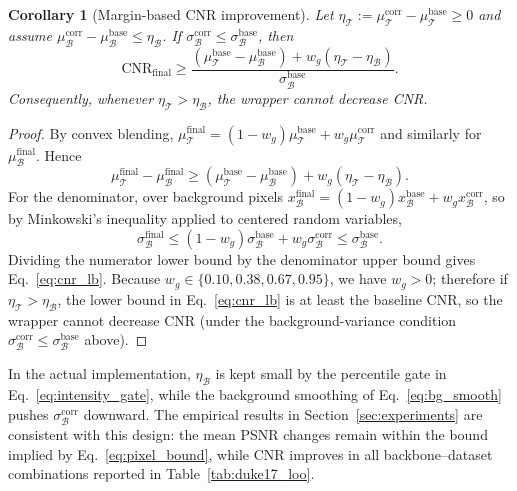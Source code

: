 \documentclass{ieeetj}
\newtheorem{corollary}{Corollary}
\begin{document}
\begin{corollary}[Margin-based CNR improvement]
\label{cor:cnr}
Let $\eta_\mathcal{T}:=\mu_\mathcal{T}^{\text{corr}}-\mu_\mathcal{T}^{\text{base}}\ge 0$ and assume $\mu_\mathcal{B}^{\text{corr}}-\mu_\mathcal{B}^{\text{base}}\le \eta_\mathcal{B}$. If $\sigma_\mathcal{B}^{\text{corr}}\le \sigma_\mathcal{B}^{\text{base}}$, then
\begin{equation}
\mathrm{CNR}_{\mathrm{final}} \ge \frac{(\mu_\mathcal{T}^{\text{base}}-\mu_\mathcal{B}^{\text{base}}) + w_g(\eta_\mathcal{T}-\eta_\mathcal{B})}{\sigma_\mathcal{B}^{\text{base}}}.
\label{eq:cnr_lb}
\end{equation}
Consequently, whenever $\eta_\mathcal{T}>\eta_\mathcal{B}$, the wrapper cannot decrease CNR.
\end{corollary}
\begin{proof}
By convex blending,
$\mu_\mathcal{T}^{\text{final}}=(1-w_g)\mu_\mathcal{T}^{\text{base}}+w_g\mu_\mathcal{T}^{\text{corr}}$
and similarly for $\mu_\mathcal{B}^{\text{final}}$. Hence
\[
\mu_\mathcal{T}^{\text{final}}-\mu_\mathcal{B}^{\text{final}}
\ge (\mu_\mathcal{T}^{\text{base}}-\mu_\mathcal{B}^{\text{base}})
+ w_g(\eta_\mathcal{T}-\eta_\mathcal{B}).
\]
For the denominator, over background pixels
$x_\mathcal{B}^{\text{final}}=(1-w_g)x_\mathcal{B}^{\text{base}}+w_g x_\mathcal{B}^{\text{corr}}$,
so by Minkowski's inequality applied to centered random variables,
\[
\sigma_\mathcal{B}^{\text{final}}
\le (1-w_g)\sigma_\mathcal{B}^{\text{base}} + w_g \sigma_\mathcal{B}^{\text{corr}}
\le \sigma_\mathcal{B}^{\text{base}}.
\]
Dividing the numerator lower bound by the denominator upper bound gives Eq.~\eqref{eq:cnr_lb}. Because $w_g\in\{0.10,0.38,0.67,0.95\}$, we have $w_g>0$; therefore if $\eta_\mathcal{T}>\eta_\mathcal{B}$, the lower bound in Eq.~\eqref{eq:cnr_lb} is at least the baseline CNR, so the wrapper cannot decrease CNR (under the background-variance condition $\sigma_\mathcal{B}^{\text{corr}}\le \sigma_\mathcal{B}^{\text{base}}$ above).
\end{proof}

In the actual implementation, $\eta_\mathcal{B}$ is kept small by the percentile gate in Eq.~\eqref{eq:intensity_gate}, while the background smoothing of Eq.~\eqref{eq:bg_smooth} pushes $\sigma_\mathcal{B}^{\text{corr}}$ downward. The empirical results in Section~\ref{sec:experiments} are consistent with this design: the mean PSNR changes remain within the bound implied by Eq.~\eqref{eq:pixel_bound}, while CNR improves in all backbone--dataset combinations reported in Table~\ref{tab:duke17_loo}.
\end{document}
